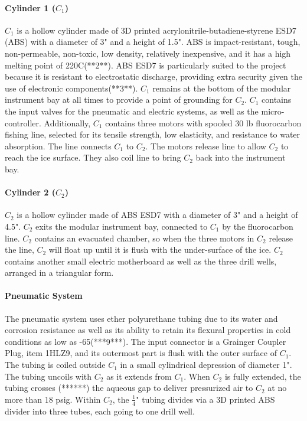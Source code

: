 \documentclass{article}
\begin{document}
\paragraph{Cylinder 1 ($C_1$)}

$C_1$ is a hollow cylinder made of 3D printed acrylonitrile-butadiene-styrene ESD7 (ABS) with a diameter of 3" and a height of 1.5". ABS is impact-resistant, tough, non-permeable, non-toxic, low density, relatively inexpensive, and it has a high melting point of 220C(**2**). ABS ESD7 is particularly suited to the project because it is resistant to electrostatic discharge, providing extra security given the use of electronic components(**3**). $C_1$ remains at the bottom of the modular instrument bay at all times to provide a point of grounding for $C_2$. $C_1$ contains the input valves for the pneumatic and electric systems, as well as the micro-controller. Additionally, $C_1$ contains three motors with spooled 30 lb fluorocarbon fishing line, selected for its tensile strength, low elasticity, and resistance to water absorption. The line connects $C_1$ to $C_2$. The motors release line to allow $C_2$ to reach the ice surface. They also coil line to bring $C_2$ back into the instrument bay.

\paragraph{Cylinder 2 ($C_2$)}
$C_2$ is a hollow cylinder made of ABS ESD7 with a diameter of 3" and a height of 4.5". $C_2$ exits the modular instrument bay, connected to $C_1$ by the fluorocarbon line. $C_2$ contains an evacuated chamber, so when the three motors in $C_2$ release the line, $C_2$ will float up until it is flush with the under-surface of the ice. $C_2$ contains another small electric motherboard as well as the three drill wells, arranged in a triangular form.

\paragraph{Pneumatic System}
The pneumatic system uses ether polyurethane tubing due to its water and corrosion resistance as well as its ability to retain its flexural properties in cold conditions as low as -65(***9***). The input connector is a Grainger Coupler Plug, item 1HLZ9, and its outermost part is flush with the outer surface of $C_1$. The tubing is coiled outside $C_1$ in a small cylindrical depression of diameter 1". The tubing uncoils with $C_2$ as it extends from $C_1$. When $C_2$ is fully extended, the tubing crosses (******) the aqueous gap to deliver pressurized air to $C_2$ at no more than 18 psig. Within $C_2$, the $\frac{1}{4}$" tubing divides via a 3D printed ABS divider into three tubes, each going to one drill well.
\end{document}
